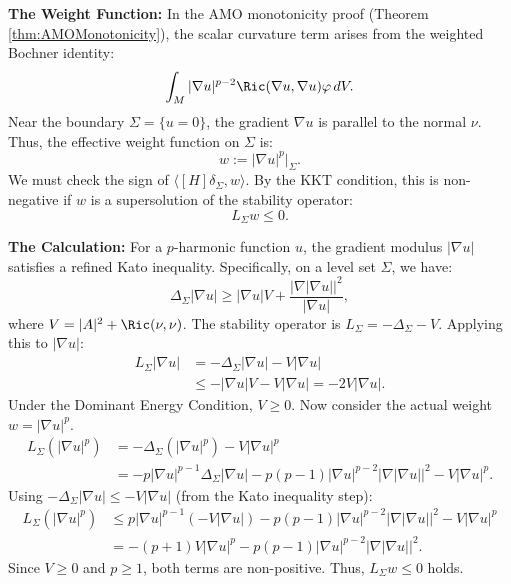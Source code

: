 \textbf{The Weight Function:}
In the AMO monotonicity proof (Theorem \ref{thm:AMOMonotonicity}), the scalar curvature term arises from the weighted Bochner identity:
\begin{equation}
    \int_M |\nabla u|^{p-2} \Ric(\nabla u, \nabla u) \varphi \, dV.
\end{equation}
Near the boundary $\Sigma = \{u=0\}$, the gradient $\nabla u$ is parallel to the normal $\nu$. Thus, the effective weight function on $\Sigma$ is:
\begin{equation}
    w := |\nabla u|^p \big|_\Sigma.
\end{equation}
We must check the sign of $\langle [H]\delta_\Sigma, w \rangle$. By the KKT condition, this is non-negative if $w$ is a supersolution of the stability operator:
\begin{equation}
    L_\Sigma w \le 0.
\end{equation}

\textbf{The Calculation:}
For a $p$-harmonic function $u$, the gradient modulus $|\nabla u|$ satisfies a refined Kato inequality. Specifically, on a level set $\Sigma$, we have:
\begin{equation}
    \Delta_\Sigma |\nabla u| \ge |\nabla u| V + \frac{|\nabla |\nabla u||^2}{|\nabla u|},
\end{equation}
where $V = |A|^2 + \Ric(\nu, \nu)$.
The stability operator is $L_\Sigma = -\Delta_\Sigma - V$.
Applying this to $|\nabla u|$:
\begin{align*}
    L_\Sigma |\nabla u| &= -\Delta_\Sigma |\nabla u| - V |\nabla u| \\
    &\le - |\nabla u| V - V |\nabla u| = - 2 V |\nabla u|.
\end{align*}
Under the Dominant Energy Condition, $V \ge 0$.
Now consider the actual weight $w = |\nabla u|^p$.
\begin{align*}
    L_\Sigma (|\nabla u|^p) &= -\Delta_\Sigma (|\nabla u|^p) - V |\nabla u|^p \\
    &= -p |\nabla u|^{p-1} \Delta_\Sigma |\nabla u| - p(p-1) |\nabla u|^{p-2} |\nabla |\nabla u||^2 - V |\nabla u|^p.
\end{align*}
Using $-\Delta_\Sigma |\nabla u| \le -V |\nabla u|$ (from the Kato inequality step):
\begin{align*}
    L_\Sigma (|\nabla u|^p) &\le p |\nabla u|^{p-1} (-V |\nabla u|) - p(p-1) |\nabla u|^{p-2} |\nabla |\nabla u||^2 - V |\nabla u|^p \\
    &= -(p+1) V |\nabla u|^p - p(p-1) |\nabla u|^{p-2} |\nabla |\nabla u||^2.
\end{align*}
Since $V \ge 0$ and $p \ge 1$, both terms are non-positive. Thus, $L_\Sigma w \le 0$ holds.

